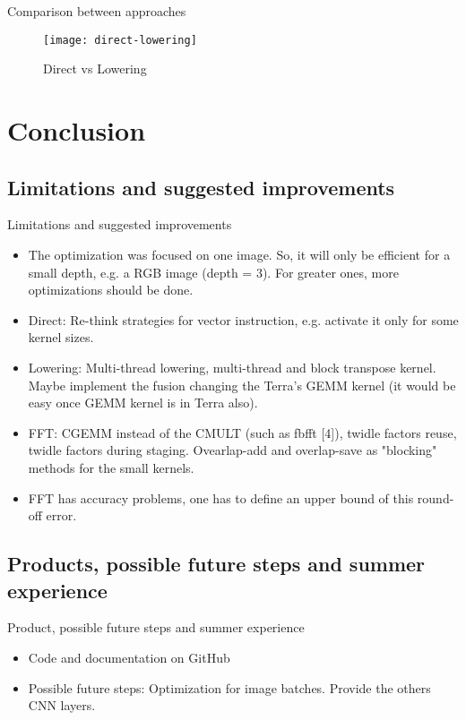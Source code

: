 \documentclass{beamer}
\begin{document}
\begin{frame}{Comparison between approaches}
\begin{figure}[ht] \label{fig1} 
\texttt{[image: direct-lowering]}
 \caption{Direct vs Lowering} 
\end{figure}
\end{frame}

\section{Conclusion}
\subsection{Limitations and suggested improvements}
\begin{frame}{Limitations and suggested improvements}
  \begin{itemize}
  \item {
   The optimization was focused on one image. So, it will only be efficient for a small depth, e.g. a RGB image (depth = 3). For greater ones, more optimizations should be done.
  }
  \item {
   Direct: Re-think strategies for vector instruction, e.g. activate it only for some kernel sizes. 
  }
  \item {
   Lowering: Multi-thread lowering, multi-thread and block transpose kernel. Maybe implement the fusion changing the Terra's GEMM kernel (it would be easy once GEMM kernel is in Terra also).
  }
  \item {
   FFT: CGEMM instead of the CMULT (such as fbfft [4]), twidle factors reuse, twidle factors during staging. Ovearlap-add and overlap-save as "blocking" methods for the small kernels. 
  }
  \item {
  FFT has accuracy problems, one has to define an upper bound of this round-off error.
  }
  \end{itemize}
\end{frame}
\subsection{Products, possible future steps and summer experience}
\begin{frame}{Product, possible future steps and summer experience}
  \begin{itemize}
  \item {
   Code and documentation on GitHub
  }
  \item {
   Possible future steps: Optimization for image batches.    Provide the others CNN layers.
  }
  \end{itemize}
\end{frame}
\end{document}

